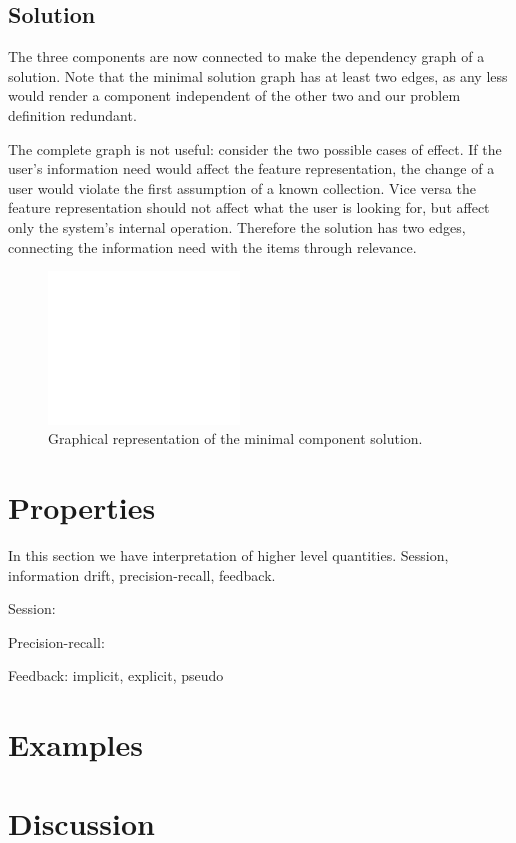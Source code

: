 \documentclass[10pt]{article}
\begin{document}
\subsection{Solution}
The three components are now connected to make the dependency graph of a solution. Note that the minimal solution graph has at least two edges, as any less would render a component independent of the other two and our problem definition redundant.

The complete graph is not useful: consider the two possible cases of effect. If the user's information need would affect the feature representation, the change of a user would violate the first assumption of a known collection. Vice versa the feature representation should not affect what the user is looking for, but affect only the system's internal operation. Therefore the solution has two edges, connecting the information need with the items through relevance.

\begin{figure}[h]
  \includegraphics[width=2in]{empty}
  \caption{Graphical representation of the minimal component solution.}
  \label{fig:connections1}
\end{figure}



\section{Properties}

In this section we have interpretation of higher level quantities. Session, information drift, precision-recall, feedback.

Session:

Precision-recall:

Feedback: implicit, explicit, pseudo


\section{Examples}

\section{Discussion}
\end{document}
